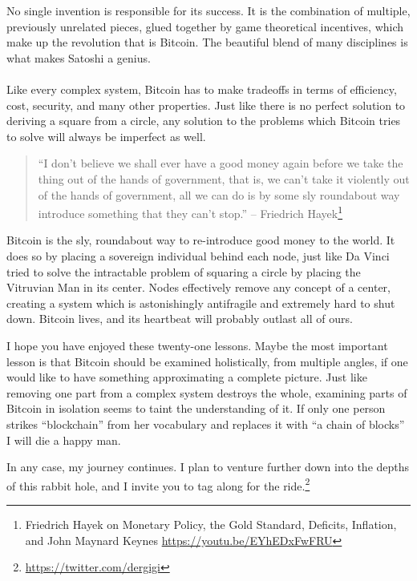No single invention is responsible for its success. It is the combination of
multiple, previously unrelated pieces, glued together by game theoretical
incentives, which make up the revolution that is Bitcoin. The beautiful blend of
many disciplines is what makes Satoshi a genius.

\paragraph{} Like every complex system, Bitcoin has to make tradeoffs in terms
of efficiency, cost, security, and many other properties. Just like there is no
perfect solution to deriving a square from a circle, any solution to the
problems which Bitcoin tries to solve will always be imperfect as well.

\begin{samepage}\begin{quotation}
\enquote{I don’t believe we shall ever have a good money again before we take the
thing out of the hands of government, that is, we can’t take it violently
out of the hands of government, all we can do is by some sly roundabout way
introduce something that they can’t stop.}
\flushright -- Friedrich Hayek\footnote{Friedrich Hayek on Monetary Policy, the Gold Standard, Deficits, Inflation, and John Maynard Keynes \url{https://youtu.be/EYhEDxFwFRU}}
\end{quotation}\end{samepage}

Bitcoin is the sly, roundabout way to re-introduce good money to the world. It
does so by placing a sovereign individual behind each node, just like Da Vinci
tried to solve the intractable problem of squaring a circle by placing the
Vitruvian Man in its center. Nodes effectively remove any concept of a center,
creating a system which is astonishingly antifragile and extremely hard to shut
down. Bitcoin lives, and its heartbeat will probably outlast all of ours.

I hope you have enjoyed these twenty-one lessons. Maybe the most important
lesson is that Bitcoin should be examined holistically, from multiple angles, if
one would like to have something approximating a complete picture. Just like
removing one part from a complex system destroys the whole, examining parts of
Bitcoin in isolation seems to taint the understanding of it. If only one person
strikes \enquote{blockchain} from her vocabulary and replaces it with \enquote{a
chain of blocks} I will die a happy man.

In any case, my journey continues. I plan to venture further down into the
depths of this rabbit hole, and I invite you to tag
along for the ride.\footnote{\url{https://twitter.com/dergigi}}

%
